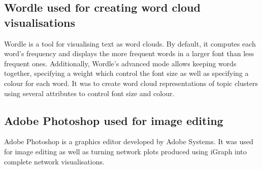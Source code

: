 \subsection{Wordle used for creating word cloud visualisations}

Wordle \cite{wordle} is a tool for visualising text as word clouds. By default, it computes each word's frequency and displays the more frequent words in a larger font than less frequent ones. Additionally, Wordle's advanced mode allows keeping words together, specifying a weight which control the font size as well as specifying a colour for each word. It was to create word cloud representations of topic clusters using several attributes to control font size and colour.

\subsection{Adobe Photoshop used for image editing}

Adobe Photoshop \cite{adobe_photoshop} is a graphics editor developed by Adobe Systems. It was used for image editing as well as turning network plots produced using iGraph into complete network visualisations.